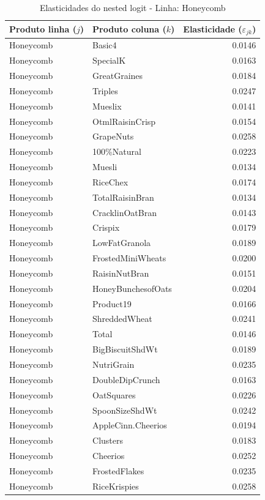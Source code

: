 \begingroup
\begin{table}[H]
\centering
\caption{Elasticidades do nested logit - Linha: Honeycomb}
\label{tab:elas-nested-honeycomb}
\small
\begin{tabular}{llr}
\toprule
Produto linha ($j$) & Produto coluna ($k$) & Elasticidade ($\varepsilon_{jk}$) \\
\midrule
Honeycomb & Basic4 & 0.0146 \\
Honeycomb & SpecialK & 0.0163 \\
Honeycomb & GreatGraines & 0.0184 \\
Honeycomb & Triples & 0.0247 \\
Honeycomb & Mueslix & 0.0141 \\
Honeycomb & OtmlRaisinCrisp & 0.0154 \\
Honeycomb & GrapeNuts & 0.0258 \\
Honeycomb & 100\%Natural & 0.0223 \\
Honeycomb & Muesli & 0.0134 \\
Honeycomb & RiceChex & 0.0174 \\
Honeycomb & TotalRaisinBran & 0.0134 \\
Honeycomb & CracklinOatBran & 0.0143 \\
Honeycomb & Crispix & 0.0179 \\
Honeycomb & LowFatGranola & 0.0189 \\
Honeycomb & FrostedMiniWheats & 0.0200 \\
Honeycomb & RaisinNutBran & 0.0151 \\
Honeycomb & HoneyBunchesofOats & 0.0204 \\
Honeycomb & Product19 & 0.0166 \\
Honeycomb & ShreddedWheat & 0.0241 \\
Honeycomb & Total & 0.0146 \\
Honeycomb & BigBiscuitShdWt & 0.0189 \\
Honeycomb & NutriGrain & 0.0235 \\
Honeycomb & DoubleDipCrunch & 0.0163 \\
Honeycomb & OatSquares & 0.0226 \\
Honeycomb & SpoonSizeShdWt & 0.0242 \\
Honeycomb & AppleCinn.Cheerios & 0.0194 \\
Honeycomb & Clusters & 0.0183 \\
Honeycomb & Cheerios & 0.0252 \\
Honeycomb & FrostedFlakes & 0.0235 \\
Honeycomb & RiceKrispies & 0.0258 \\

\end{tabular}
\end{table}
